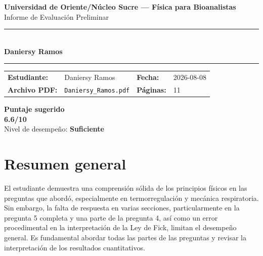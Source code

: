 \documentclass[11pt,a4paper]{article}
\begin{document}
\begin{center}
  {\Large\bfseries\color{azulTitulo} Universidad de Oriente/Núcleo Sucre --- Física para Bioanalistas}\\[4pt]
  {\large Informe de Evaluación Preliminar}\\[12pt]
  \rule{\linewidth}{1.2pt}\\[6pt]
  {\LARGE\bfseries Daniersy Ramos}\\[4pt]
  \rule{\linewidth}{0.6pt}
\end{center}

\vspace{4pt}
\begin{tcolorbox}[cajaTitulo, title=Datos del informe]
\begin{tabular}{@{}llll@{}}
  \textbf{Estudiante:}  & Daniersy Ramos  &
  \textbf{Fecha:}       & 2026-08-08 \\[4pt]
  \textbf{Archivo PDF:} & \texttt{Daniersy\_Ramos.pdf}  &
  \textbf{Páginas:}     & 11 \\
\end{tabular}
\end{tcolorbox}

\vspace{6pt}
\begin{center}
  \begin{tcolorbox}[
    enhanced,
    colback=white, colframe=desempeno_suficiente,
    width=0.62\linewidth,
    boxrule=2pt,
    halign=center, valign=center,
    top=8pt, bottom=8pt,
  ]
    \centering
    {\large\bfseries Puntaje sugerido}\\[6pt]
    {\Huge\bfseries\color{desempeno_suficiente} 6.6/10}\\[6pt]
    {\large Nivel de desempeño: \textbf{\color{desempeno_suficiente} Suficiente}}
  \end{tcolorbox}
\end{center}

\section*{Resumen general}
El estudiante demuestra una comprensión sólida de los principios físicos en las preguntas que abordó, especialmente en termorregulación y mecánica respiratoria. Sin embargo, la falta de respuesta en varias secciones, particularmente en la pregunta 5 completa y una parte de la pregunta 4, así como un error procedimental en la interpretación de la Ley de Fick, limitan el desempeño general. Es fundamental abordar todas las partes de las preguntas y revisar la interpretación de los resultados cuantitativos.
\end{document}

